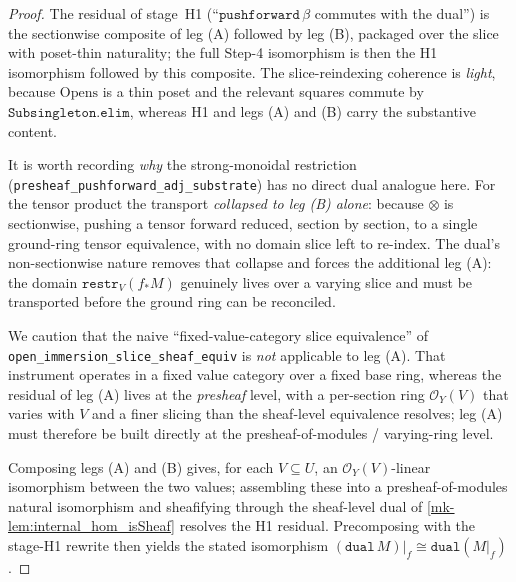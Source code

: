 \begin{proof}
  The residual of stage~H1 (``\(\mathtt{pushforward}\,\beta\) commutes with the dual'') is
  the sectionwise composite of leg (A) followed by leg (B), packaged over the slice with
  poset-thin naturality; the full Step-4 isomorphism is then the H1 isomorphism followed by
  this composite. The slice-reindexing coherence is \emph{light}, because \(\mathrm{Opens}\)
  is a thin poset and the relevant squares commute by \(\mathtt{Subsingleton.elim}\),
  whereas H1 and legs (A) and (B) carry the substantive content.

  It is worth recording \emph{why} the strong-monoidal restriction
  (\texttt{presheaf\_pushforward\_adj\_substrate}) has no direct dual analogue here. For
  the tensor product the transport \emph{collapsed to leg (B) alone}: because \(\otimes\)
  is sectionwise, pushing a tensor forward reduced, section by section, to a single
  ground-ring tensor equivalence, with no domain slice left to re-index. The dual's
  non-sectionwise nature removes that collapse and forces the additional leg (A): the
  domain \(\mathtt{restr}_V(f_*M)\) genuinely lives over a varying slice and must be
  transported before the ground ring can be reconciled.

  We caution that the naive ``fixed-value-category slice equivalence'' of
  \texttt{open\_immersion\_slice\_sheaf\_equiv} is \emph{not} applicable to leg (A). That instrument
  operates in a fixed value category over a fixed base ring, whereas the residual of
  leg (A) lives at the \emph{presheaf} level, with a per-section ring \(\mathcal{O}_Y(V)\)
  that varies with \(V\) and a finer slicing than the sheaf-level equivalence resolves;
  leg (A) must therefore be built directly at the presheaf-of-modules / varying-ring level.

  Composing legs (A) and (B) gives, for each \(V \subseteq U\), an
  \(\mathcal{O}_Y(V)\)-linear isomorphism between the two values; assembling these into a
  presheaf-of-modules natural isomorphism and sheafifying through the sheaf-level dual of
  \ref{mk-lem:internal_hom_isSheaf} resolves the H1 residual. Precomposing with the stage-H1
  rewrite then yields the stated isomorphism
  \((\mathtt{dual}\,M)|_f \cong \mathtt{dual}(M|_f)\).


\end{proof}

